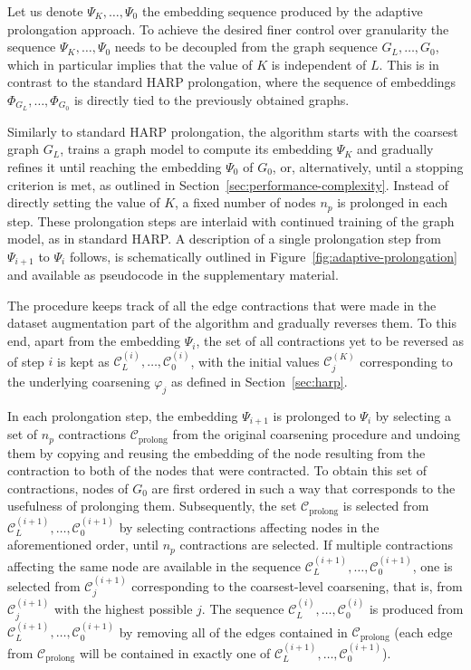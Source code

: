 Let us denote \( \Psi_K, \dots, \Psi_0 \) the embedding sequence produced by the adaptive prolongation approach. To achieve the desired finer control over granularity the sequence \( \Psi_K, \dots, \Psi_0 \) needs to be decoupled from the graph sequence \( G_L, \dots, G_0 \), which in particular implies that the value of \( K \) is independent of \( L \). This is in contrast to the standard HARP prolongation, where the sequence of embeddings \( \Phi_{G_L}, \dots, \Phi_{G_0} \) is directly tied to the previously obtained graphs.

Similarly to standard HARP prolongation, the algorithm starts with the coarsest graph \( G_L \), trains a graph model to compute its embedding \( \Psi_K \) and gradually refines it until reaching the embedding \( \Psi_0 \) of \( G_0 \), or, alternatively, until a stopping criterion is met, as outlined in Section~\ref{sec:performance-complexity}. Instead of directly setting the value of \( K \), a fixed number of nodes \( n_p \) is prolonged in each step. These prolongation steps are interlaid with continued training of the graph model, as in standard HARP.  A description of a single prolongation step from \( \Psi_{i + 1} \) to \( \Psi_i \) follows, is schematically outlined in Figure~\ref{fig:adaptive-prolongation} and available as pseudocode in the supplementary material.

The procedure keeps track of all the edge contractions that were made in the dataset augmentation part of the algorithm and gradually reverses them. To this end, apart from the embedding \( \Psi_i \), the set of all contractions yet to be reversed as of step \( i \) is kept as \( \mathcal{C}_L^{(i)}, \dots, \mathcal{C}_0^{(i)} \), with the initial values \( \mathcal{C}_j^{(K)} \) corresponding to the underlying coarsening \( \varphi_j \) as defined in Section~\ref{sec:harp}.

In each prolongation step, the embedding \( \Psi_{i + 1} \) is prolonged to \( \Psi_i \) by selecting a set of \( n_p \) contractions \( \mathcal{C}_\mathrm{prolong} \) from the original coarsening procedure and undoing them by copying and reusing the embedding of the node resulting from the contraction to both of the nodes that were contracted. To obtain this set of contractions, nodes of \( G_0 \) are first ordered in such a way that corresponds to the usefulness of prolonging them. Subsequently, the set \( \mathcal{C}_\mathrm{prolong} \) is selected from \( \mathcal{C}_L^{(i + 1)}, \dots, \mathcal{C}_0^{(i + 1)} \) by selecting contractions affecting nodes in the aforementioned order, until \( n_p \) contractions are selected. If multiple contractions affecting the same node are available in the sequence \( \mathcal{C}_L^{(i + 1)}, \dots, \mathcal{C}_0^{(i + 1)} \), one is selected from \( \mathcal{C}_j^{(i + 1)} \) corresponding to the coarsest-level coarsening, that is, from \( \mathcal{C}_j^{(i + 1)} \) with the highest possible \( j \). The sequence \( \mathcal{C}_L^{(i)}, \dots, \mathcal{C}_0^{(i)} \) is produced from \( \mathcal{C}_L^{(i + 1)}, \dots, \mathcal{C}_0^{(i + 1)} \) by removing all of the edges contained in \( \mathcal{C}_\mathrm{prolong} \) (each edge from \( \mathcal{C}_\mathrm{prolong} \) will be contained in exactly one of \( \mathcal{C}_L^{(i + 1)}, \dots, \mathcal{C}_0^{(i + 1)} \)).

